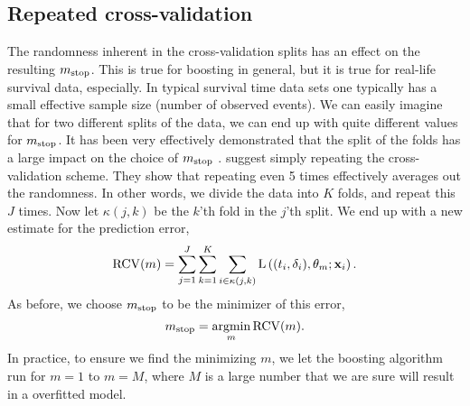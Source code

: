 \subsection{Repeated cross-validation}
The randomness inherent in the cross-validation splits has an effect on the resulting $m_{\text{stop}}$. This is true for boosting in general, but it is true for real-life survival data, especially. In typical survival time data sets one typically has a small effective sample size (number of observed events). We can easily imagine that for two different splits of the data, we can end up with quite different values for $m_{\text{stop}}$.
It has been very effectively demonstrated that the split of the folds has a large impact on the choice of $m_{\text{stop}}$ \citep{seibold}. \citet{seibold} suggest simply repeating the cross-validation scheme. They show that repeating even 5 times effectively averages out the randomness.  In other words, we divide the data into $K$ folds, and repeat this $J$ times. Now let $\kappa(j, k)$ be the $k$'th fold in the $j$'th split. We end up with a new estimate for the prediction error,
\begin{equation}
    \operatorname{RCV}(m)=\sum_{j=1}^J\sum_{k=1}^K\sum_{i\in\kappa(j,k)}\operatorname{L}\left((t_i,\delta_i),\theta_m;\mathbf{x}_i\right).
\end{equation}
As before, we choose $m_{\text{stop}}$ to be the minimizer of this error,
\begin{equation}
    m_{\text{stop}}=\operatorname*{argmin}_{m}\operatorname{RCV}(m).
\end{equation}
In practice, to ensure we find the minimizing $m$, we let the boosting algorithm run for $m=1$ to $m=M$, where $M$ is a large number that we are sure will result in a overfitted model.